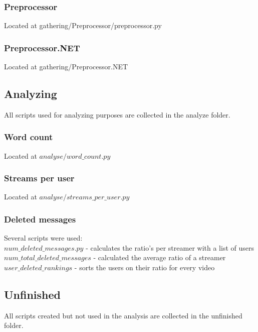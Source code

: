 \documentclass[final]{report} %
\begin{document}
\begin{appendices}
\subsubsection{Preprocessor}
\label{script:preprocessor}
Located at gathering/Preprocessor/preprocessor.py\\

\subsubsection{Preprocessor.NET}
\label{script:preprocessor.NET}
Located at gathering/Preprocessor.NET\\

\subsection{Analyzing}
All scripts used for analyzing purposes are collected in the analyze folder.
\subsubsection{Word count}
\label{script:word_count}
Located at $analyse/word\_count.py$\\

\subsubsection{Streams per user}
\label{script:streams_per_user}
Located at $analyse/streams\_per\_user.py$\\

\subsubsection{Deleted messages}
\label{script:deleted_messages}
Several scripts were used:\\
$num\_deleted\_messages.py$ - calculates the ratio's per streamer with a list of users\\
$num\_total\_deleted\_messages$ - calculated the average ratio of a streamer\\
$user\_deleted\_rankings$ - sorts the users on their ratio for every video\\

\subsection{Unfinished}
All scripts created but not used in the analysis are collected in the unfinished folder.


\end{appendices}
\end{document}
